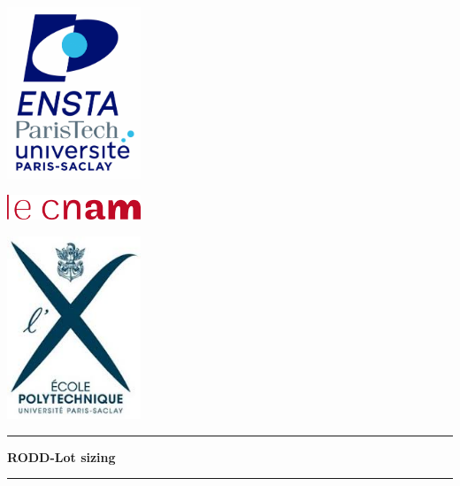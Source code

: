 \documentclass[12pt,a4paper]{article}
\begin{document}
\setcounter{page}{0}


\begin{center}

\begin{minipage}[l]{.2\linewidth}
	\flushleft\includegraphics[width=4cm]{img/logo_ENSTA.jpg}
\end{minipage}
\begin{minipage}[r]{.35\linewidth}
	\flushright\includegraphics[width=4cm]{img/logo_CNAM.png}
\end{minipage}
\begin{minipage}[r]{.3\linewidth}
	\flushright\includegraphics[width=4cm]{img/logo_X.jpg}
\end{minipage}
\vspace{1.5cm}

\hrule \vspace{0.5cm}
\begin{LARGE}
	\textbf{RODD-Lot sizing}\\
\end{LARGE}
\vspace{0.5cm} \hrule
\vspace{3cm}


\end{center}
\end{document}
